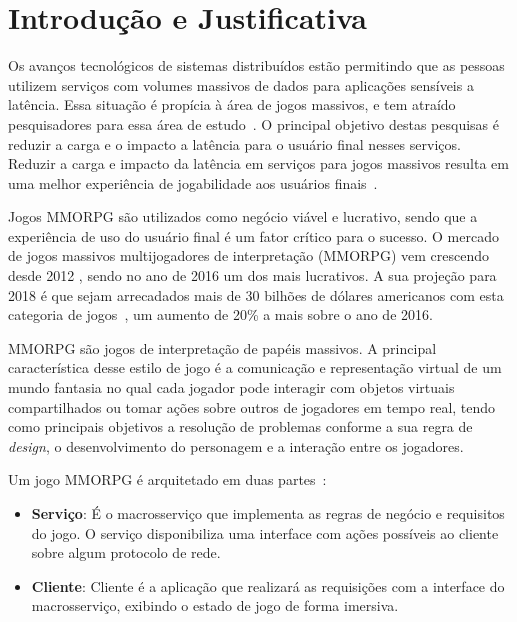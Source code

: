 \section{Introdução e Justificativa}
\label{sec:int}

Os avanços tecnológicos de sistemas distribuídos estão permitindo que as pessoas utilizem serviços com volumes massivos de dados para aplicações sensíveis a latência.
%
Essa situação é propícia à área de jogos massivos, e tem atraído pesquisadores para essa área de estudo~\cite{mmo_analytic,1417630,6267019,6063041}.
%
O principal objetivo destas pesquisas é reduzir a carga e o impacto a latência para o usuário final nesses serviços.
%
Reduzir a carga e impacto da latência em serviços para jogos massivos resulta em uma melhor experiência de jogabilidade aos usuários finais~\cite{1417630}.


Jogos \ac{MMORPG} são utilizados como negócio viável e lucrativo, sendo que a experiência de uso do usuário final é um fator crítico para o sucesso.
%
O mercado de jogos massivos multijogadores de interpretação (\ac{MMORPG}) vem crescendo desde 2012 \cite{new_york_times}, sendo no ano de 2016 um dos mais lucrativos\cite{statista_2016}.
%
A sua projeção para 2018 é que sejam arrecadados mais de 30 bilhões de dólares americanos com esta categoria de jogos~\cite{statista_2018}, um aumento de 20\% a mais sobre o ano de 2016.



\ac{MMORPG} são jogos de interpretação de papéis massivos.
%
A principal característica desse estilo de jogo é a comunicação e representação virtual de um mundo fantasia no qual cada jogador pode interagir com objetos virtuais compartilhados ou tomar ações sobre outros de jogadores em tempo real, tendo como principais objetivos a resolução de problemas conforme a sua regra de \textit{design}, o desenvolvimento do personagem e a interação entre os jogadores\cite{video_game_technologies}.
%

Um jogo \ac{MMORPG} é arquitetado em duas partes~\cite{mmo_analytic}:
\begin{itemize}
  \item \textbf{Serviço}: É o macrosserviço que implementa as regras de negócio e requisitos do jogo.
  O serviço disponibiliza uma interface com ações possíveis ao cliente sobre algum protocolo de rede.
  \item \textbf{Cliente}: Cliente é a aplicação que realizará as requisições com a interface do macrosserviço, exibindo o estado de jogo de forma imersiva.
\end{itemize}

